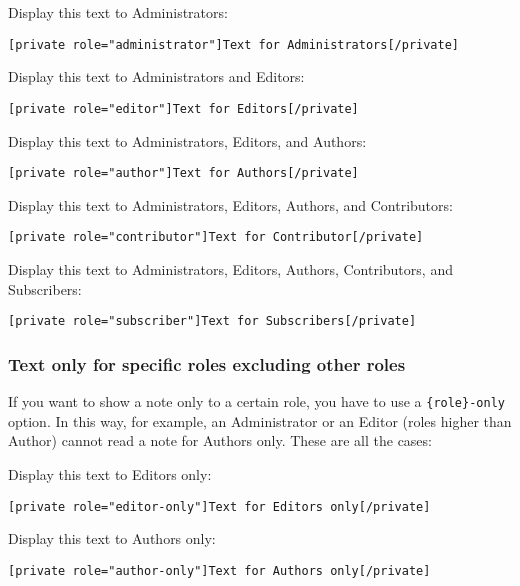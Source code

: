 \documentclass[a4paper,10pt]{article}
\begin{document}
Display this text to Administrators:

\begin{lstlisting}
[private role="administrator"]Text for Administrators[/private]
\end{lstlisting}

Display this text to Administrators and Editors:

\begin{lstlisting}
[private role="editor"]Text for Editors[/private]
\end{lstlisting}

Display this text to Administrators, Editors, and Authors:

\begin{lstlisting}
[private role="author"]Text for Authors[/private]
\end{lstlisting}

Display this text to Administrators, Editors, Authors, and Contributors:

\begin{lstlisting}
[private role="contributor"]Text for Contributor[/private]
\end{lstlisting}

Display this text to Administrators, Editors, Authors, Contributors, and Subscribers:

\begin{lstlisting}
[private role="subscriber"]Text for Subscribers[/private]
\end{lstlisting}

\subsubsection{Text only for specific roles excluding other roles}

If you want to show a note only to a certain role, you have to use a \verb+{role}-only+ option. In this way, for example, an Administrator or an Editor (roles higher than Author) cannot read a note for Authors only. These are all the cases: \newline

Display this text to Editors only:

\begin{lstlisting}
[private role="editor-only"]Text for Editors only[/private]
\end{lstlisting}

Display this text to Authors only:

\begin{lstlisting}
[private role="author-only"]Text for Authors only[/private]
\end{lstlisting}
\end{document}
